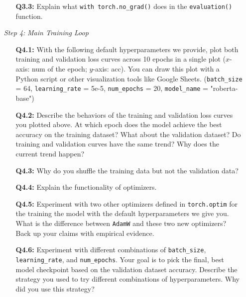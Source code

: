 \documentclass{article}
\begin{document}
\begin{itemize}
\begin{itemize}
        \item[\textbf{Q3.3:}] Explain what \texttt{with torch.no\_grad()} does
        in the \texttt{evaluation()} function.
    \end{itemize}

    
    \item[\textit{Step 4:}] \textit{Main Training Loop}

    \begin{itemize}
        \item[\textbf{Q4.1:}] With the following default hyperparameters we
        provide, plot both training and validation loss curves across 10 epochs
        in a single plot ($x$-axis: num of the epoch; $y$-axis: acc). You can
        draw this plot with a Python script or other visualization tools like
        Google Sheets. (\texttt{batch\_size} = 64, \texttt{learning\_rate} =
        5e-5, \texttt{num\_epochs} = 20, \texttt{model\_name} = "roberta-base")
        
        \item[\textbf{Q4.2:}] Describe the behaviors of the training and
        validation loss curves you plotted above. At which epoch does the model
        achieve the best accuracy on the training dataset? What about the
        validation dataset? Do training and validation curves have the same
        trend? Why does the current trend happen?
        
        \item[\textbf{Q4.3:}] Why do you shuffle the training data but not the
        validation data?
        
        \item[\textbf{Q4.4:}] Explain the functionality of optimizers.
        
        \item[\textbf{Q4.5:}] Experiment with two other optimizers defined in
        \texttt{torch.optim} for the training the model with the default
        hyperparameters we give you. What is the difference between
        \texttt{AdamW} and these two new optimizers? Back up your claims with
        empirical evidence.
        
        \item[\textbf{Q4.6:}] Experiment with different combinations of
        \texttt{batch\_size}, \texttt{learning\_rate}, and \texttt{num\_epochs}.
        Your goal is to pick the final, best model checkpoint based on the
        validation dataset accuracy. Describe the strategy you used to try
        different combinations of hyperparameters. Why did you use this
        strategy?
        

\end{itemize}
\end{itemize}
\end{document}
